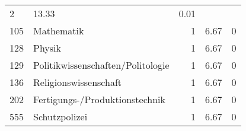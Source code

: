 \begin{longtable}{lXrrr}
       \num{2} &
       \num[round-mode=places,round-precision=2]{13,33} &
         \num[round-mode=places,round-precision=2]{0,01} \\

     105 &
     \multicolumn{1}{X}{ Mathematik   } &


       \num{1} &
       \num[round-mode=places,round-precision=2]{6,67} &
         \num[round-mode=places,round-precision=2]{0} \\

     128 &
     \multicolumn{1}{X}{ Physik   } &


       \num{1} &
       \num[round-mode=places,round-precision=2]{6,67} &
         \num[round-mode=places,round-precision=2]{0} \\

     129 &
     \multicolumn{1}{X}{ Politikwissenschaften/Politologie   } &


       \num{1} &
       \num[round-mode=places,round-precision=2]{6,67} &
         \num[round-mode=places,round-precision=2]{0} \\

     136 &
     \multicolumn{1}{X}{ Religionswissenschaft   } &


       \num{1} &
       \num[round-mode=places,round-precision=2]{6,67} &
         \num[round-mode=places,round-precision=2]{0} \\

     202 &
     \multicolumn{1}{X}{ Fertigungs-/Produktionstechnik   } &


       \num{1} &
       \num[round-mode=places,round-precision=2]{6,67} &
         \num[round-mode=places,round-precision=2]{0} \\

     555 &
     \multicolumn{1}{X}{ Schutzpolizei   } &


       \num{1} &
       \num[round-mode=places,round-precision=2]{6,67} &
         \num[round-mode=places,round-precision=2]{0} \\


\end{longtable}
